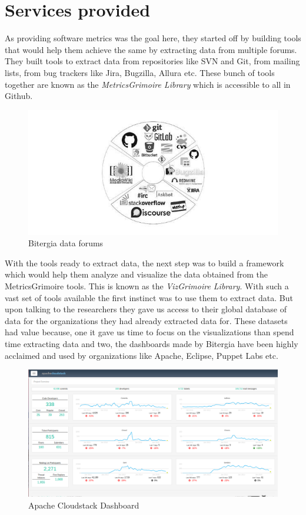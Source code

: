 \documentclass[seploa]{beavtex}
\begin{document}
\section{Services provided}
As providing software metrics was the goal here, they started off by building tools that would help them achieve the same by extracting data from multiple forums. They built tools to extract data from repositories like SVN and Git, from mailing lists, from bug trackers like Jira, Bugzilla, Allura etc. These bunch of tools together are known as the \emph{MetricsGrimoire Library} which is accessible to all in Github.

\begin{figure}[!ht]
\centering
\includegraphics[width=140mm]{bitergia.jpg}
\caption{Bitergia data forums}
\end{figure}

With the tools ready to extract data, the next step was to build a framework which would help them analyze and visualize the data obtained from the MetricsGrimoire tools. This is known as the \emph{VizGrimoire Library}. With such a vast set of tools available the first instinct was to use them to extract data. But upon talking to the researchers they gave us access to their global database of data for the organizations they had already extracted data for. These datasets had value because, one it gave us time to focus on the visualizations than spend time extracting data and two, the dashboards made by Bitergia have been highly acclaimed and used by organizations like Apache, Eclipse, Puppet Labs etc.

\begin{figure}[H]
\centering
\includegraphics[width=120mm]{apache.png}
\caption{Apache Cloudstack Dashboard}
\end{figure}
\end{document}
